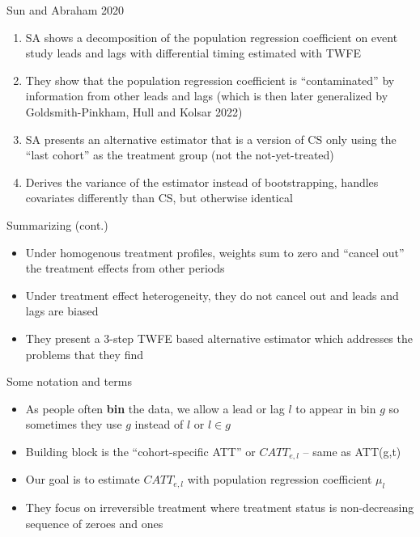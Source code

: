 \documentclass{beamer}
\begin{document}
\begin{frame}{Sun and Abraham 2020}

	\begin{enumerate}
	\item SA shows a decomposition of the population regression coefficient on event study leads and lags with differential timing estimated with TWFE
	\item They show that the population regression coefficient is ``contaminated'' by information from other leads and lags (which is then later generalized by Goldsmith-Pinkham, Hull and Kolsar 2022)
	\item SA presents an alternative estimator that is a version of CS only using the ``last cohort'' as the treatment group (not the not-yet-treated)
	\item Derives the variance of the estimator instead of bootstrapping, handles covariates differently than CS, but otherwise identical
	\end{enumerate}

\end{frame}

\begin{frame}{Summarizing (cont.)}

\begin{itemize}
\item Under homogenous treatment profiles, weights sum to zero and ``cancel out'' the treatment effects from other periods 
\item Under treatment effect heterogeneity, they do not cancel out and leads and lags are biased
\item They present a 3-step TWFE based alternative estimator which addresses the problems that they find
\end{itemize}

\end{frame}


\begin{frame}{Some notation and terms}

\begin{itemize}
\item As people often \textbf{bin} the data, we allow a lead or lag $l$ to appear in bin $g$ so sometimes they use $g$ instead of $l$ or $l \in g$
\item Building block is the ``cohort-specific ATT'' or $CATT_{e,l}$ -- same as ATT(g,t)
\item Our goal is to estimate $CATT_{e,l}$ with population regression coefficient $\mu_l$
\item They focus on irreversible treatment where treatment status is non-decreasing sequence of zeroes and ones
\end{itemize}

\end{frame}
\end{document}
